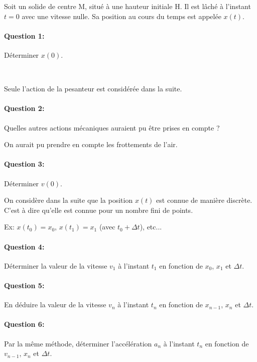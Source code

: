 




Soit un solide de centre M, situé à une hauteur initiale H. Il est lâché à l'instant $t=0$ avec une vitesse nulle. Sa position au cours du temps est appelée $x(t)$.

\paragraph{Question 1:} Déterminer $x(0)$.

~\

Seule l'action de la pesanteur est considérée dans la suite.

\paragraph{Question 2:} Quelles autres actions mécaniques auraient pu être prises en compte ?

On aurait pu prendre en compte les frottements de l'air.

\paragraph{Question 3:} Déterminer $v(0)$.

On considère dans la suite que la position $x(t)$ est connue de manière discrète. C'est à dire qu'elle est connue pour un nombre fini de points.

Ex: $x(t_0)=x_0$, $x(t_1)=x_1$ (avec $t_0+\Delta t$), etc...

\paragraph{Question 4:} Déterminer la valeur de la vitesse $v_1$ à l'instant $t_1$ en fonction de $x_0$, $x_1$ et $\Delta t$.

\paragraph{Question 5:} En déduire la valeur de la vitesse $v_n$ à l'instant $t_n$ en fonction de $x_{n-1}$, $x_n$ et $\Delta t$.

\paragraph{Question 6:} Par la même méthode, déterminer l'accélération $a_n$ à l'instant $t_n$ en fonction de $v_{n-1}$, $x_n$ et $\Delta t$.

